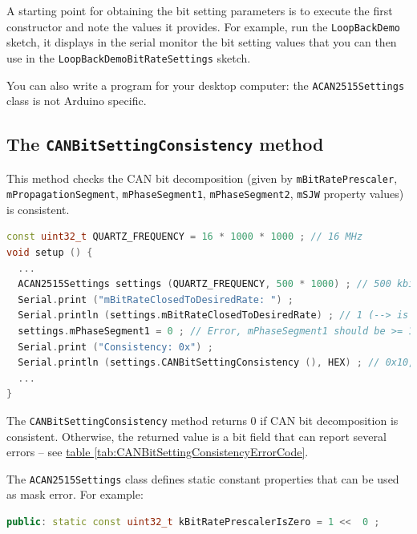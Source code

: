 \documentclass[9pt, a4paper, obeyspaces]{extarticle}
\newcommand \subsectionLabel[2]{\subsection{#1}\label{subsec:#2}}
\newcommand\refTableau[1]{\hyperref[tab:#1]{table \ref*{tab:#1}}}
\begin{document}
A starting point for obtaining the bit setting parameters is to execute the first constructor and note the values it provides. For example, run the \texttt{LoopBackDemo} sketch, it displays in the serial monitor the bit setting values that you can then use in the \texttt{LoopBackDemoBitRateSettings} sketch.

You can also write a program for your desktop computer: the \texttt{ACAN2515Settings} class is not Arduino specific.





\subsectionLabel{The \texttt{CANBitSettingConsistency} method}{CANBitSettingConsistency}

This method checks the CAN bit decomposition (given by \texttt{mBitRatePrescaler}, \texttt{mPropagationSegment}, \texttt{mPhaseSegment1}, \texttt{mPhaseSegment2}, \texttt{mSJW} property values) is consistent.

{ \small\begin{lstlisting}[language=c++]
const uint32_t QUARTZ_FREQUENCY = 16 * 1000 * 1000 ; // 16 MHz
void setup () {
  ...
  ACAN2515Settings settings (QUARTZ_FREQUENCY, 500 * 1000) ; // 500 kbit/s
  Serial.print ("mBitRateClosedToDesiredRate: ") ;
  Serial.println (settings.mBitRateClosedToDesiredRate) ; // 1 (--> is true)
  settings.mPhaseSegment1 = 0 ; // Error, mPhaseSegment1 should be >= 1 (and <= 8)
  Serial.print ("Consistency: 0x") ;
  Serial.println (settings.CANBitSettingConsistency (), HEX) ; // 0x10, meaning error
  ...
}
\end{lstlisting}}

The \texttt{CANBitSettingConsistency} method returns $0$ if CAN bit decomposition is consistent. Otherwise, the returned value is a bit field that can report several errors -- see \refTableau{CANBitSettingConsistencyErrorCode}.


The \texttt{ACAN2515Settings} class defines static constant properties that can be used as mask error. For example:
{ \small\begin{lstlisting}[language=c++]
public: static const uint32_t kBitRatePrescalerIsZero = 1 <<  0 ;
\end{lstlisting}}
\end{document}
